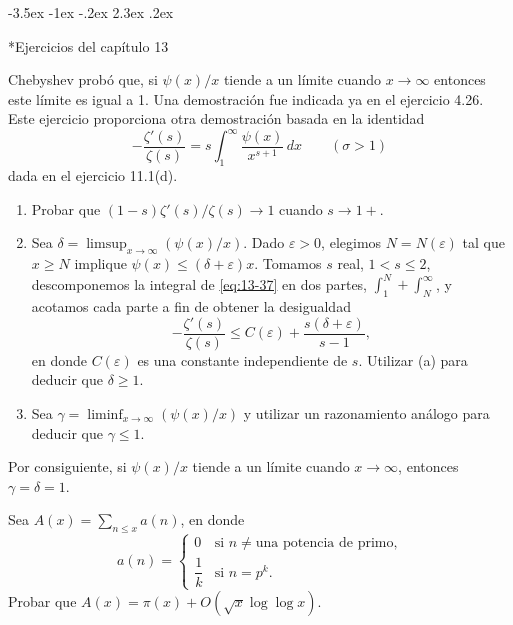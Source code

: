 \documentclass[12pt,a4paper]{book}
\makeatletter
\renewcommand\section{\@startsection{section}{1}{\z@}%
  {-3.5ex \@plus -1ex \@minus -.2ex}%
  {2.3ex \@plus .2ex}%
  {\normalfont\Large\bfseries\raggedright}}
\makeatother
\begin{document}
    \section*{Ejercicios del capítulo 13}

    \begin{ejercicio}
        Chebyshev probó que, si $\psi(x)/x$ tiende a un límite cuando $x\to\infty$ entonces este
        límite es igual a 1. Una demostración fue indicada ya en el ejercicio 4.26. Este
        ejercicio proporciona otra demostración basada en la identidad
        \begin{equation}\label{eq:13-37}
            -\frac{\zeta'(s)}{\zeta(s)}=s\int_{1}^{\infty}\frac{\psi(x)}{x^{s+1}}\,dx\qquad(\sigma>1)
        \end{equation}
        dada en el ejercicio 11.1(d).
        \begin{enumerate}
            \item[(a)] Probar que $(1-s)\zeta'(s)/\zeta(s)\to1$ cuando $s\to1+$.
            \item[(b)] Sea $\delta=\limsup_{x\to\infty}(\psi(x)/x)$. Dado $\varepsilon>0$,
            elegimos $N=N(\varepsilon)$ tal que $x\geq N$ implique
            $\psi(x)\leq(\delta+\varepsilon)x$. Tomamos $s$ real, $1<s\leq2$, descomponemos la
            integral de \eqref{eq:13-37} en dos partes, $\int_{1}^{N}+\int_{N}^{\infty}$, y acotamos
            cada parte a fin de obtener la desigualdad
            \begin{equation*}
                -\frac{\zeta'(s)}{\zeta(s)}\leq C(\varepsilon)+\frac{s(\delta+\varepsilon)}{s-1},
            \end{equation*}
            en donde $C(\varepsilon)$ es una constante independiente de $s$. Utilizar (a) para
            deducir que $\delta\geq1$.
            \item[(c)] Sea $\gamma=\liminf_{x\to\infty}(\psi(x)/x)$ y utilizar un razonamiento
            análogo para deducir que $\gamma\leq1$.
        \end{enumerate}
        Por consiguiente, si $\psi(x)/x$ tiende a un límite cuando $x\to\infty$, entonces
        $\gamma=\delta=1$.
    \end{ejercicio}

    \begin{ejercicio}
        Sea $A(x)=\sum_{n\leq x}a(n)$, en donde
        \begin{equation*}
            a(n)=
            \begin{cases}
                0&\text{si }n\neq\text{una potencia de primo,}\\
                \dfrac{1}{k}&\text{si }n=p^{k}.
            \end{cases}
        \end{equation*}
        Probar que $A(x)=\pi(x)+O(\sqrt{x}\log\log x)$.
    \end{ejercicio}
\end{document}
